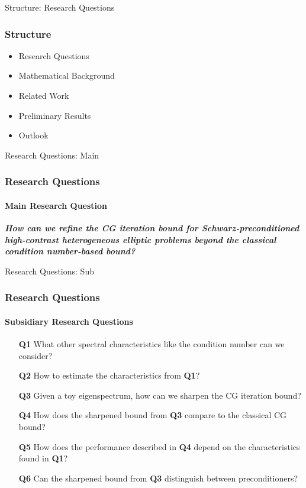 \begin{frame}[label=questions]{Structure: Research Questions}
    \frametitle{Structure}
    \begin{itemize}
        \item {\color{tud grapefruit}Research Questions}
        \item Mathematical Background
        \item Related Work
        \item Preliminary Results
        \item Outlook
    \end{itemize}
\end{frame}

\begin{frame}[label=questions]{Research Questions: Main}
    \frametitle{Research Questions}
    \framesubtitle{Main Research Question}
    \vspace{0.2\pageheight}
    \begin{center}
    \textit{\textbf{How can we refine the CG iteration bound for Schwarz-preconditioned high-contrast heterogeneous elliptic problems beyond the classical condition number-based bound?}}
    \end{center}
\end{frame}

\begin{frame}[label=questions]{Research Questions: Sub}
    \frametitle{Research Questions}
    \framesubtitle{Subsidiary Research Questions}
    \setlength\itemindent{1in}
    \begin{itemize}
        \item[\textbf{Q1}] What other spectral characteristics like the condition number can we consider?
        \item[\textbf{Q2}] How to estimate the characteristics from \textbf{Q1}?
        \item[\textbf{Q3}] Given a toy eigenspectrum, how can we sharpen the CG iteration bound?
        \item[\textbf{Q4}] How does the sharpened bound from \textbf{Q3} compare to the classical CG bound?
        \item[\textbf{Q5}] How does the performance described in \textbf{Q4} depend on the characteristics found in \textbf{Q1}?
        \item[\textbf{Q6}] Can the sharpened bound from \textbf{Q3} distinguish between preconditioners? 
    \end{itemize}
\end{frame}